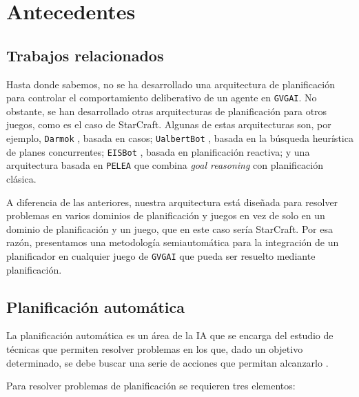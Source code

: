 
\chapter{Antecedentes}

\section{Trabajos relacionados}

Hasta donde sabemos, no se ha desarrollado una arquitectura de planificación para
controlar el comportamiento deliberativo de un agente en \texttt{GVGAI}. No
obstante, se han desarrollado otras arquitecturas de planificación para otros juegos,
como es el caso de StarCraft. Algunas de estas arquitecturas son, por ejemplo,
\texttt{Darmok} \cite{10.1007/978-3-540-74141-1_12}, basada en casos;
\texttt{UalbertBot} \cite{Churchill2011BuildOO}, basada en la búsqueda heurística de
planes concurrentes; \texttt{EISBot} \cite{Weber2011BuildingHA}, basada en planificación reactiva;
y una arquitectura basada en \texttt{PELEA} \cite{Alczar2010peleaP} que combina
\textit{goal reasoning} \cite{Aha_2018} con planificación clásica.

A diferencia de las anteriores, nuestra arquitectura está diseñada para resolver
problemas en varios dominios de planificación y juegos en vez de solo en un
dominio de planificación y un juego, que en este caso sería StarCraft.
Por esa razón, presentamos una metodología semiautomática para la integración de un
planificador en cualquier juego de \texttt{GVGAI} que pueda ser resuelto mediante
planificación.

\section{Planificación automática}

La planificación automática es un área de la IA que se encarga del estudio de
técnicas que permiten resolver problemas en los que, dado un objetivo determinado,
se debe buscar una serie de acciones que permitan alcanzarlo \cite{10.5555/3073924}.

Para resolver problemas de planificación se requieren tres elementos:

